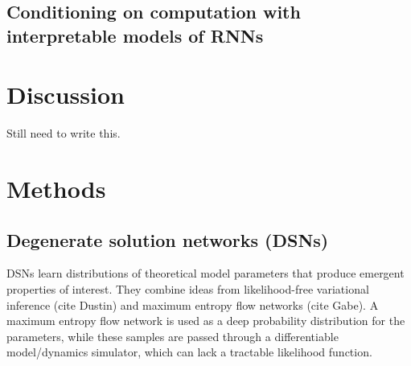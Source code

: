 \documentclass[11pt]{article}
\begin{document}
\subsection{Conditioning on computation with interpretable models of RNNs}


\section{Discussion}
Still need to write this.




\appendix

\section{Methods}
\subsection{Degenerate solution networks (DSNs)}
DSNs learn distributions of theoretical model parameters that produce emergent properties of interest.  They combine ideas from likelihood-free variational inference (cite Dustin) and maximum entropy flow networks (cite Gabe).  A maximum entropy flow network is used as a deep probability distribution for the parameters, while these samples are passed through a differentiable model/dynamics simulator, which can lack a tractable likelihood function.
\end{document}
